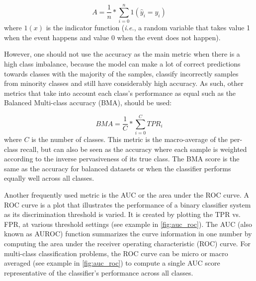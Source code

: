     \begin{equation}
        A = \frac{1}{n} * \sum_{i=0}^{n} 1(\hat{y}_i = y_i) 
        \label{eq:acc}
    \end{equation}
    where $1(x)$ is the indicator function (\textit{i.e.}, a random variable that takes value 1 when the event happens and value 0 when the event does not happen). \par
    
    However, one should not use the accuracy as the main metric when there is a high class imbalance, because the model can make a lot of correct predictions towards classes with the majority of the samples, classify incorrectly samples from minority classes and still have considerably high accuracy. As such, other metrics that take into account each class's performance as equal such as the Balanced Multi-class accuracy (\ac{BMA}), should be used:
    
    \begin{equation} 
        BMA = \frac{1}{C} * \sum_{i=0}^{C} TPR_i 
        \label{eqs:bma}    
    \end{equation}
    where $C$ is the number of classes. This metric is the macro-average of the per-class recall, but can also be seen as the accuracy where each sample is weighted according to the inverse pervasiveness of its true class. The \ac{BMA} score is the same as the accuracy for balanced datasets or when the classifier performs equally well across all classes. 
    
    Another frequently used metric is the \ac{AUC} or the area under the \ac{ROC} curve. A \ac{ROC} curve is a plot that illustrates the performance of a binary classifier system as its discrimination threshold is varied. It is created by plotting the \ac{TPR} vs. \ac{FPR}, at various threshold settings (see example in \autoref{fig:auc_roc}). The \ac{AUC} (also known as AUROC) function summarizes the curve information in one number by computing the area under the receiver operating characteristic (ROC) curve. For multi-class classification problems, the \ac{ROC} curve can be micro or macro averaged (see example in \autoref{fig:auc_roc}) to compute a single \ac{AUC} score representative of the classifier's performance across all classes. \par
    
